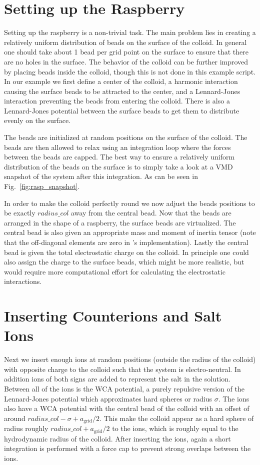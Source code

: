 \documentclass[
paper=a4,                       %
fontsize=11pt,                  %
twoside,                        %
footsepline,                    %
headsepline,                    %
headinclude=false,              %
footinclude=false,              %
pagesize,                       %
]{scrartcl}
\begin{document}
\section{Setting up the Raspberry}

Setting up the raspberry is a non-trivial task. The main problem lies in creating a relatively
uniform distribution of beads on the surface of the colloid. In general one should take about 1 bead per grid
point on the surface to ensure that there are no holes in the surface. The behavior of the colloid can be further improved by placing
beads inside the colloid, though this is not done in this example script. In our example
we first define a center of the colloid, a harmonic interaction causing the surface beads to be attracted
to the center, and a Lennard-Jones interaction preventing the beads from entering the colloid. There is also a Lennard-Jones
potential between the surface beads to get them to distribute evenly on the surface. 

The beads are initialized at random positions on the surface of the colloid. The beads are then allowed to relax using
an integration loop where the forces between the beads are capped. The best way to ensure a relatively uniform distribution
of the beads on the surface is to simply take a look at a VMD snapshot of the system after this integration. As can
be seen in Fig.~\ref{fig:rasp_snapshot}.

In order to make the colloid perfectly round we now adjust the beads positions to be exactly $radius\_col$ away
from the central bead.
Now that the beads are arranged in the shape of a raspberry, the surface beads are virtualized. The central
bead is also given an appropriate mass and moment of inertia tensor (note that the off-diagonal elements
are zero in \es{}'s implementation). Lastly the central bead is given the total electrostatic charge on the colloid. In principle
one could also assign the charge to the surface beads, which might be more realistic, but would require more computational
effort for calculating the electrostatic interactions.

\section{Inserting Counterions and Salt Ions}

Next we insert enough ions at random positions (outside the radius of the colloid) with opposite charge to the colloid such that the system is electro-neutral. In addition ions
of both signs are added to represent the salt in the solution. Between all of the ions is the WCA potential, a purely repulsive
version of the Lennard-Jones potential which approximates hard spheres or radius $\sigma$. The ions also have a WCA potential
with the central bead of the colloid with an offset of around $radius\_col-\sigma +a_\mathrm{grid}/2$. This make
the colloid appear as a hard sphere of radius roughly $radius\_col+a_\mathrm{grid}/2$ to the ions, which is roughly equal to the
hydrodynamic radius of the colloid. After inserting the ions, again a short integration is performed with a force cap to
prevent strong overlaps between the ions.
\end{document}

